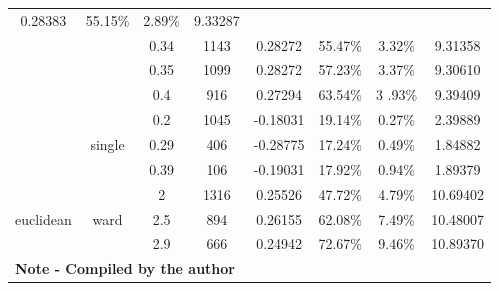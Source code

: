 \begin{table}[H]
{\begin{tabular}{|cccccccc|}
  \multicolumn{1}{c|}{0.28383} &
  \multicolumn{1}{c|}{55.15\%} &
  \multicolumn{1}{c|}{2.89\%} &
  9.33287 \\ \cline{3-8} 
\multicolumn{1}{|c|}{} &
  \multicolumn{1}{c|}{} &
  \multicolumn{1}{c|}{0.34} &
  \multicolumn{1}{c|}{1143} &
  \multicolumn{1}{c|}{0.28272} &
  \multicolumn{1}{c|}{55.47\%} &
  \multicolumn{1}{c|}{3.32\%} &
  9.31358 \\ \cline{3-8} 
\multicolumn{1}{|c|}{} &
  \multicolumn{1}{c|}{} &
  \multicolumn{1}{c|}{0.35} &
  \multicolumn{1}{c|}{1099} &
  \multicolumn{1}{c|}{0.28272} &
  \multicolumn{1}{c|}{57.23\%} &
  \multicolumn{1}{c|}{3.37\%} &
  9.30610 \\ \cline{3-8} 
\multicolumn{1}{|c|}{} &
  \multicolumn{1}{c|}{} &
  \multicolumn{1}{c|}{0.4} &
  \multicolumn{1}{c|}{916} &
  \multicolumn{1}{c|}{0.27294} &
  \multicolumn{1}{c|}{63.54\%} &
  \multicolumn{1}{c|}{3 .93\%} &
  9.39409 \\ \cline{2-8} 
\multicolumn{1}{|c|}{} &
  \multicolumn{1}{c|}{\multirow{3}{*}{single}} &
  \multicolumn{1}{c|}{0.2} &
  \multicolumn{1}{c|}{1045} &
  \multicolumn{1}{c|}{-0.18031} &
  \multicolumn{1}{c|}{19.14\%} &
  \multicolumn{1}{c|}{0.27\%} &
  2.39889 \\ \cline{3-8} 
\multicolumn{1}{|c|}{} &
  \multicolumn{1}{c|}{} &
  \multicolumn{1}{c|}{0.29} &
  \multicolumn{1}{c|}{406} &
  \multicolumn{1}{c|}{-0.28775} &
  \multicolumn{1}{c|}{17.24\%} &
  \multicolumn{1}{c|}{0.49\%} &
  1.84882 \\ \cline{3-8} 
\multicolumn{1}{|c|}{} &
  \multicolumn{1}{c|}{} &
  \multicolumn{1}{c|}{0.39} &
  \multicolumn{1}{c|}{106} &
  \multicolumn{1}{c|}{-0.19031} &
  \multicolumn{1}{c|}{17.92\%} &
  \multicolumn{1}{c|}{0.94\%} &
  1.89379 \\ \hline
\multicolumn{1}{|c|}{\multirow{3}{*}{euclidean}} &
  \multicolumn{1}{c|}{\multirow{3}{*}{ward}} &
  \multicolumn{1}{c|}{2} &
  \multicolumn{1}{c|}{1316} &
  \multicolumn{1}{c|}{0.25526} &
  \multicolumn{1}{c|}{47.72\%} &
  \multicolumn{1}{c|}{4.79\%} &
  10.69402 \\ \cline{3-8} 
\multicolumn{1}{|c|}{} &
  \multicolumn{1}{c|}{} &
  \multicolumn{1}{c|}{2.5} &
  \multicolumn{1}{c|}{894} &
  \multicolumn{1}{c|}{0.26155} &
  \multicolumn{1}{c|}{62.08\%} &
  \multicolumn{1}{c|}{7.49\%} &
  10.48007 \\ \cline{3-8} 
\multicolumn{1}{|c|}{} &
  \multicolumn{1}{c|}{} &
  \multicolumn{1}{c|}{2.9} &
  \multicolumn{1}{c|}{666} &
  \multicolumn{1}{c|}{0.24942} &
  \multicolumn{1}{c|}{72.67\%} &
  \multicolumn{1}{c|}{9.46\%} &
  10.89370 \\ \hline
\multicolumn{8}{|l|}{\textbf{Note - Compiled by the author}} \\ \hline
\end{tabular}%
}
\end{table}

